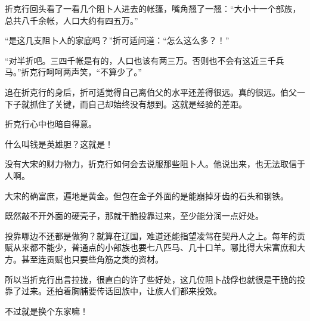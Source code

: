 折克行回头看了一看几个阻卜人进去的帐篷，嘴角翘了一翘：“大小十一个部族，总共八千余帐，人口大约有四五万。”

“是这几支阻卜人的家底吗？”折可适问道：“怎么这么多？！”

“对半折吧。三四千帐是有的，人口也该有两三万。否则也不会有这近三千兵马。”折克行呵呵两声笑，“不算少了。”

追在折克行的身后，折可适觉得自己离伯父的水平还差得很远。真的很远。伯父一下子就抓住了关键，而自己却始终没有想到。这就是经验的差距。

折克行心中也暗自得意。

什么叫钱是英雄胆？这就是！

没有大宋的财力物力，折克行如何会去说服那些阻卜人。他说出来，也无法取信于人啊。

大宋的确富庶，遍地是黄金。但包在金子外面的是能崩掉牙齿的石头和钢铁。

既然敲不开外面的硬壳子，那就干脆投靠过来，至少能分润一点好处。

投靠哪边不还都是做狗？就算在辽国，难道还能指望凌驾在契丹人之上。每年的贡赋从来都不能少，普通点的小部族也要七八匹马、几十口羊。哪比得大宋富庶和大方。甚至连贡赋也只要些角筋之类的资材。

所以当折克行出言拉拢，很直白的许了些好处，这几位阻卜战俘也就很是干脆的投靠了过来。还拍着胸脯要传话回族中，让族人们都来投效。

不过就是换个东家嘛！